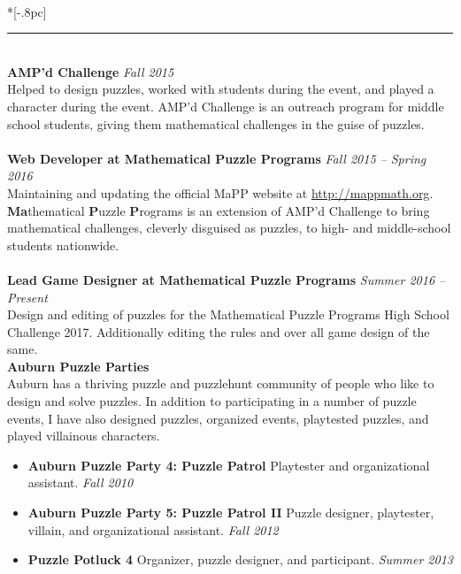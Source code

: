 \documentclass{article}
\begin{document}
 \\*[-.8pc]
\rule{\textwidth}{.1pt} \\
\textbf{AMP'd Challenge} \hfill \textit{Fall 2015}\\
Helped to design puzzles, worked with students during the event, and played a
character during the event. AMP'd Challenge is an outreach program for middle
school students, giving them
mathematical challenges in the guise of puzzles.  \\
\\
\textbf{Web Developer at Mathematical Puzzle Programs} \hfill \textit{Fall 2015
  -- Spring 2016}\\
Maintaining and updating the official MaPP website at
\url{http://mappmath.org}. \textbf{Ma}thematical \textbf{P}uzzle \textbf{P}rograms
is an extension of AMP'd Challenge to bring mathematical challenges, cleverly
disguised as puzzles, to high- and middle-school students nationwide.\\
\\
\textbf{Lead Game Designer at Mathematical Puzzle Programs} \hfill
\textit{Summer 2016 -- Present}\\
Design and editing of puzzles for the Mathematical Puzzle Programs High School
Challenge 2017. Additionally editing the rules and over all game design of the
same. \\
\textbf{Auburn Puzzle Parties}\\
Auburn has a thriving puzzle and puzzlehunt community of people who like to
design and solve puzzles. In addition to participating in a number of puzzle
events, I have also designed puzzles, organized events, playtested puzzles, and
played villainous characters.
\begin{itemize}[noitemsep]
\item \textbf{Auburn Puzzle Party 4: Puzzle Patrol} Playtester and
  organizational assistant. \hfill \textit{Fall 2010}
\item \textbf{Auburn Puzzle Party 5: Puzzle Patrol II} Puzzle designer,
  playtester, villain, and organizational assistant. \hfill \textit{Fall 2012}
\item \textbf{Puzzle Potluck 4} Organizer, puzzle designer, and
  participant. \hfill \textit{Summer 2013}
\end{itemize}

\
\end{document}

